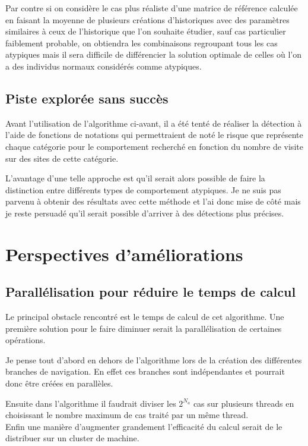 \documentclass[a4paper, 11pt]{article}
\begin{document}
Par contre si on considère le cas plus réaliste d'une matrice de référence calculée en faisant la moyenne de plusieurs créations d'historiques avec des paramètres similaires à ceux de l'historique que l'on souhaite étudier, sauf cas particulier faiblement probable, on obtiendra les combinaisons regroupant tous les cas atypiques mais il sera difficile de différencier la solution optimale de celles où l'on a des individus normaux considérés comme atypiques.

\subsection{Piste explorée sans succès}

Avant l'utilisation de l'algorithme ci-avant, il a été tenté de réaliser la détection à l'aide de fonctions de notations qui permettraient de noté le risque que représente chaque catégorie pour le comportement recherché en fonction du nombre de visite sur des sites de cette catégorie.

L'avantage d'une telle approche est qu'il serait alors possible de faire la distinction entre différents types de comportement atypiques. Je ne suis pas parvenu à obtenir des résultats avec cette méthode et l'ai donc mise de côté mais je reste persuadé qu'il serait possible d'arriver à des détections plus précises.

\section{Perspectives d'améliorations}
\subsection{Parallélisation pour réduire le temps de calcul}

Le principal obstacle rencontré est le temps de calcul de cet algorithme. Une première solution pour le faire diminuer serait la parallélisation de certaines opérations.

Je pense tout d'abord en dehors de l'algorithme lors de la création des différentes branches de navigation. En effet ces branches sont indépendantes et pourrait donc être créées en parallèles.

Ensuite dans l'algorithme il faudrait diviser les $2^{N_a}$ cas sur plusieurs threads en choisissant le nombre maximum de cas traité par un même thread.\\

Enfin une manière d'augmenter grandement l'efficacité du calcul serait de le distribuer sur un cluster de machine.
\end{document}
